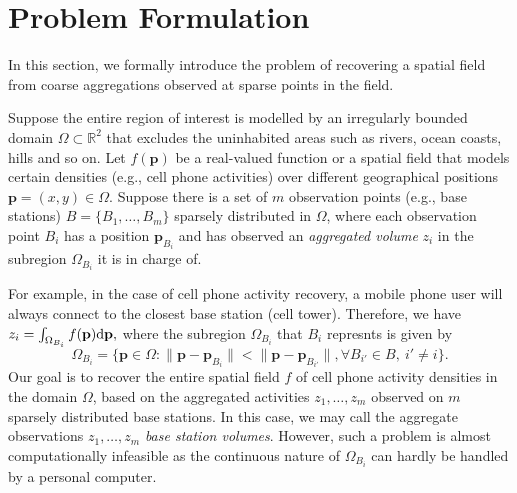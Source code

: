 \section{Problem Formulation}
\label{sec:formulation}



In this section, we formally introduce the problem of recovering a spatial field from coarse aggregations observed at sparse points in the field.

Suppose the entire region of interest is modelled by an irregularly bounded domain $\Omega \subset\mathbb R^2$ that excludes the uninhabited areas such as rivers, ocean coasts, hills and so on.
Let $f(\mathbf p)$ be a real-valued function or a spatial field that models certain densities (e.g., cell phone activities) over different geographical positions $\mathbf p = (x,y)\in\Omega$.
Suppose there is a set of $m$ observation points (e.g., base stations) $B = \{B_1,\ldots, B_m\}$ sparsely distributed in $\Omega$,
where each observation point $B_i$ has a position $\mathbf p_{B_i}$ and has observed an \emph{aggregated volume} $z_i$ in the subregion $\Omega_{B_i}$ it is in charge of. 

For example, in the case of cell phone activity recovery, a mobile phone user will always connect to the closest base station (cell tower). Therefore, we have 
$
	z_i = \int_{\Omega_{B_i}}f(\mathbf p)\mathrm{d} \mathbf p,
$
where the subregion $\Omega_{B_i}$ that $B_i$ represnts is given by 
\[
	\Omega_{B_i} = \{\mathbf p\in \Omega: \|\mathbf p-\mathbf p_{B_i}\|< \|\mathbf p-\mathbf p_{B_{i'}}\|, \forall B_{i'}\in B, \ i'\ne i\}.
\]
Our goal is to recover the entire spatial field $f$ of cell phone activity densities in the domain $\Omega$, based on the aggregated activities $z_1,\ldots, z_m$ observed on $m$ sparsely distributed base stations. In this case, we may call the aggregate observations $z_1,\ldots, z_m$ \emph{base station volumes}. However, such a problem is almost computationally infeasible as the continuous nature of $\Omega_{B_i}$ can hardly be handled by a personal computer.

